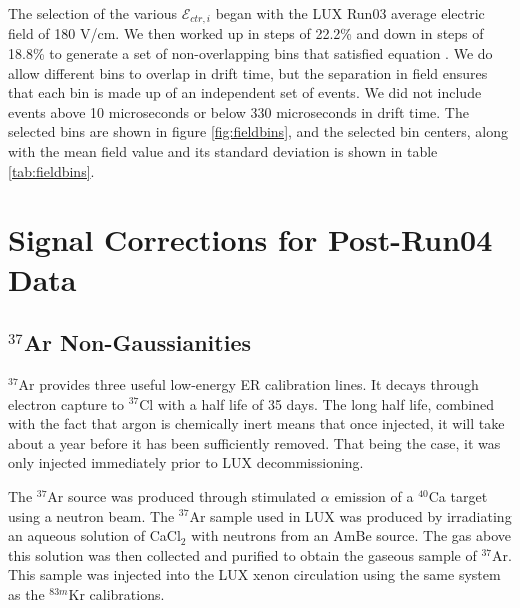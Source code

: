{The selection of the various $\mathcal{E}_{ctr,i}$ began with the LUX Run03 average electric field of 180 V/cm. We then worked up in steps of 22.2\% and down in steps of 18.8\% to generate a set of non-overlapping bins that satisfied equation  \label{eq:ebin_e}. We do allow different bins to overlap in drift time, but the separation in field ensures that each bin is made up of an independent set of events. We did not include events above 10 microseconds or below 330 microseconds in drift time. The selected bins are shown in figure \ref{fig:fieldbins}, and the selected bin centers, along with the mean field value and its standard deviation is shown in table \ref{tab:fieldbins}.

\section{Signal Corrections for Post-Run04 Data}\label{sec:corrections}

\subsection{$^{37}$Ar Non-Gaussianities}
$^{37}$Ar provides three useful low-energy ER calibration lines. It decays through electron capture to $^{37}$Cl with a half life of 35 days. The long half life, combined with the fact that argon is chemically inert means that once injected, it will take about a year before it has been sufficiently removed. That being the case, it was only injected immediately prior to LUX decommissioning\cite{ar371,pixey_ar37}.

The $^{37}$Ar source was produced through stimulated $\alpha$ emission of a $^{40}$Ca target using a neutron beam. The $^{37}$Ar sample used in LUX was produced by irradiating an aqueous solution of CaCl$_2$ with neutrons from an AmBe source. The gas above this solution was then collected and purified to obtain the gaseous sample of $^{37}$Ar\cite{pixey_ar37}. This sample was injected into the LUX xenon circulation using the same system as the $^{83m}$Kr calibrations\cite{lux_kr2}.

}
